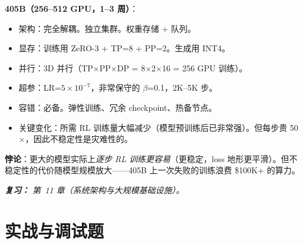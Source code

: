 \begin{questionbox}
\textbf{405B（256--512 GPU，1--3 周）}：

\begin{itemize}
  \item 架构：完全解耦。独立集群。权重存储 + 队列。
  \item 显存：训练用 ZeRO-3 + TP=8 + PP=2。生成用 INT4。
  \item 并行：3D 并行（TP$\times$PP$\times$DP = 8$\times$2$\times$16 = 256 GPU 训练）。
  \item 超参：LR=$5\times10^{-7}$，非常保守的 $\beta$=0.1，2K--5K 步。
  \item 容错：必备。弹性训练、冗余 checkpoint、热备节点。
  \item 关键变化：所需 RL 训练量大幅减少（模型预训练后已非常强）。但每步贵 50$\times$，因此不稳定性是灾难性的。
\end{itemize}

\textbf{悖论}：更大的模型实际上\emph{逐步 RL 训练更容易}（更稳定，loss 地形更平滑）。但不稳定性的代价随模型规模放大——405B 上一次失败的训练浪费 \$100K+ 的算力。

\emph{\textbf{复习：} 第~11 章（系统架构与大规模基础设施）。}
\end{questionbox}

\section{实战与调试题}
\label{practical-and-debugging-questions}

